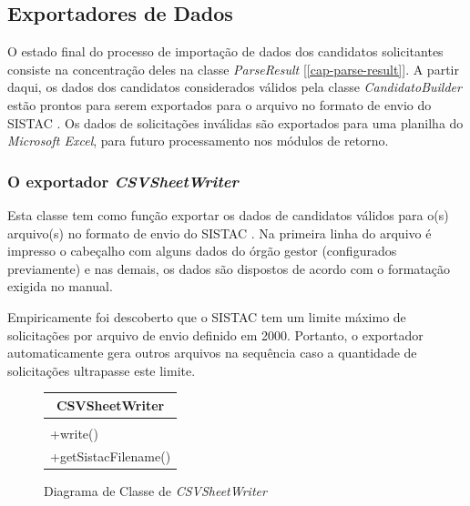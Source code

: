 \documentclass[
	12pt,			%
	openright,		%
	oneside,	
	a4paper,		%
	english,		%
	brazil			%
]{abntex2/abntex2}  %
\begin{document}
			\subsection{Exportadores de Dados}
	
				O estado final do processo de importação de dados dos candidatos solicitantes consiste na concentração deles na classe \textit{ParseResult} [\ref{cap-parse-result}]. A partir daqui, os dados dos candidatos considerados válidos pela classe \textit{CandidatoBuilder} estão prontos para serem exportados para o arquivo no formato de envio do SISTAC \cite{sistac-formatos}. Os dados de solicitações inválidas são exportados para uma planilha do \textit{Microsoft Excel}, para futuro processamento nos módulos de retorno.
	
				\subsubsection{O exportador \textit{CSVSheetWriter}}
	
					Esta classe tem como função exportar os dados de candidatos válidos para o(s) arquivo(s) no formato de envio do SISTAC \cite{sistac-formatos}. Na primeira linha do arquivo é impresso o cabeçalho com alguns dados do órgão gestor (configurados previamente) e nas demais, os dados são dispostos de acordo com o formatação exigida no manual.
	
					Empiricamente foi descoberto que o SISTAC tem um limite máximo de solicitações por arquivo de envio definido em 2000. Portanto, o exportador automaticamente gera outros arquivos na sequência caso a quantidade de solicitações ultrapasse este limite.
	
					\begin{figure}[ht]
						\begin{center}
							
							\caption{Diagrama de Classe de \textit{CSVSheetWriter}}
							\label{csvwriter-uml}
							
							\begin{tabular}{|l|}
								\hline
								\multicolumn{1}{|c|}{\textbf{CSVSheetWriter}} \\ \hline
								\\ \hline
								+write()                                      \\
								+getSistacFilename()                          \\ \hline
							\end{tabular}
							
						\end{center}
					\end{figure}
	
\end{document}
